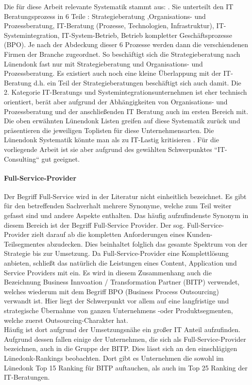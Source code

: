 Die für diese Arbeit relevante Systematik stammt aus: \cite[56]{Lippold201309}. Sie unterteilt den IT Beratungsprozess in 6 Teile :  Strategieberatung ,Organisations- und Prozessberatung, IT-Beratung (Prozesse, Technologien, Infrastruktur), IT-Systemintegration, IT-System-Betrieb, Betrieb kompletter Geschäftsprozesse (BPO). Je nach der Abdeckung dieser 6 Prozesse werden dann die verschiendenen Firmen der Branche zugeordnet. So beschäftigt sich die Strategieberatung nach Lünendonk fast nur mit Strategieberatung und Organisations- und Prozessberatung. Es existiert auch noch eine kleine Überlappung mit der IT-Beratung d.h. ein Teil der Strategieberatungen beschäftigt sich auch damit. Die 2. Kategorie IT-Beratungs und Systemintegrationsunternehmen ist eher technisch orientiert, berät aber aufgrund der Abhängigkeiten von Organisations- und Prozessberatung und der anschließenden IT Beratung auch im ersten Bereich mit. Die oben erwähnten Lünendonk Listen greifen auf diese Systematik zurück und präsentieren die jeweiligen \glqq Toplisten \grqq für diese Unternehmensarten. Die Lünendonk Systematik könnte man als zu IT-Lastig kritisieren \cite[56]{Lippold201309} . Für die vorliegende Arbeit ist sie aber aufgrund des gewählten Schwerpunktes
``IT- Consulting`` gut geeignet.

\paragraph*{Full-Service-Provider}
Der Begriff Full-Service wird in der Literatur nicht einheitlich bezeichnet. Es gibt für den betreffenden Sachverhalt mehrere Synonyme, welche zum Teil weiter gefasst sind und andere Aspekte enthalten. Das häufig aufzufindenste Synonym in diesem Bereich ist der Begriff Full-Service Provider.
Der sog. \glqq Full-Service-Provider \grqq zielt darauf ab die kompletten Anforderungen eines Kunden-Teilsegmentes abzudecken. \cite[124]{WeillVitale200106} Dies beinhaltet folglich das gesamte Spektrum von der Strategie bis zur Umsetzung. Da Full-Service-Provider eine Komplettlösung anbieten, schließt das natürlich die Leistungen eines Content, Application und Service Providers mit ein. \cite[83]{Thalmann200708}
Es wird in diesem Zusammenhang auch die Bezeichnung Business Innvoation / Transformation Partner (BITP) verwendet, welches wiederum mit dem Begriff BPO (Business Process Outsourcing) verwandt ist. Hier liegt der Schwerpunkt vor allem auf eine langfristige und strategische Übernahme von ganzen Unternehmens -oder Produktsegmenten, welche zuerst Outsourcing-Charakter hat.\cite[163]{Pohland200908}\\ Häufig ist dort aufgrund der Umsetzungsnähe ein großer IT Anteil aufzufinden. Aufgrund dessen fallen einige der Unternehmen, die sich als Full-Service-Provider bezeichnen, auch in die Gruppe der BITP. Dies lässt sich an den einschlägigen Lünedonk-Rankings beobachten. Dort gibt es Unternehmen die sowohl im Lünedonk Top 15 Ranking für BITP auftauchen, als auch im Top 25 Ranking der IT-Beratungen.\cite {topBITP} \cite {topITB}

